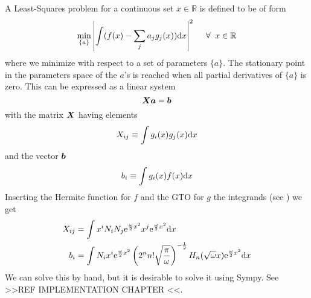     A Least-Squares problem for a continuous set $x\in\mathbb{R}$ is defined to
    be of form
        \begin{equation}
            \min_{\{a\}} \abs{\int (f(x) - \sum_ja_jg_j(x)) \md x}^2 \indent
            \forall \;\;x\in\mathbb{R}
        \end{equation}
    where we minimize with respect to a set of parameters $\{a\}$. The
    stationary point in the parameters space of the $a$'s is reached when all
    partial derivatives of $\{a\}$ is zero. This can be expressed as a linear system
        \begin{equation}
            \boldsymbol{{X}} \boldsymbol{{a}} = \boldsymbol{{b}}
        \end{equation}
    with the matrix $\boldsymbol{{X}}$ having elements
        \begin{equation}
            X_{ij} \equiv \int g_i(x)g_j(x) \mathrm{d} x
        \end{equation}
    and the vector $\boldsymbol{{b}}$
        \begin{equation}
            b_i \equiv \int g_i(x)f(x) \mathrm{d} x
        \end{equation}
    Inserting the Hermite function for $f$ and the GTO for $g$ the integrands
    (see ) we get
        \begin{equation}
            \begin{aligned}
                X_{ij} &= \int x^i N_i N_j \mathrm{e}^{\frac{\omega}{2} x^2} x^j
                \mathrm{e}^{\frac{\omega}{2} x^2} \mathrm{d} x \\
                b_i &= \int N_i x^i \mathrm{e}^{\frac{\omega}{2} x^2}
                \left(2^nn!\sqrt{\frac{\pi}{\omega}}\right)^{-\frac{1}{2}}
                H_n(\sqrt{\omega}x) \mathrm{e}^{\frac{\omega}{2} x^2} \mathrm{d} x
            \end{aligned}
        \end{equation}
    We can solve this by hand, but it is desirable to solve it using Sympy. See
    >>REF IMPLEMENTATION CHAPTER <<.

